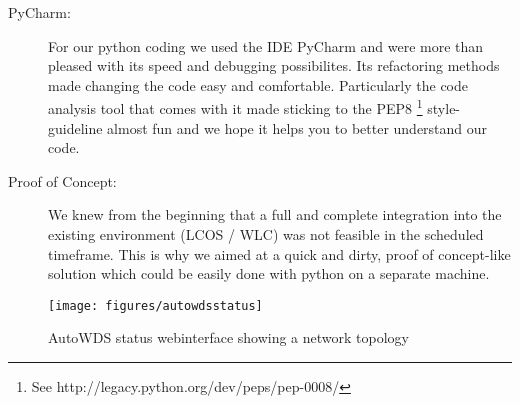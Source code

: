 \begin{description}
    \item [PyCharm:]
      For our python coding we used the \ac{IDE} PyCharm \cite{pycharm} and were more than pleased with its speed and debugging possibilites.
      Its refactoring methods made changing the code easy and comfortable. Particularly the code analysis tool that comes with it made sticking to the
      \ac{PEP8} \footnote{See http://legacy.python.org/dev/peps/pep-0008/} style-guideline almost fun and we hope it helps you to better understand our code.
      
\newpage
      
    \item [Proof of Concept:]
      We knew from the beginning that a full and complete integration into the existing environment (\ac{LCOS} / \ac{WLC}) was not feasible in the scheduled timeframe.
      This is why we aimed at a quick and dirty, proof of concept-like solution which could be easily done with python on a separate machine.
      
    \end{description}

    \begin{figure}[h]
      \centering
      \texttt{[image: figures/autowdsstatus]}
      \caption{AutoWDS status webinterface showing a network topology}
      \label{fig:autowdsstatus}
    \end{figure}
    
\clearpage

  
